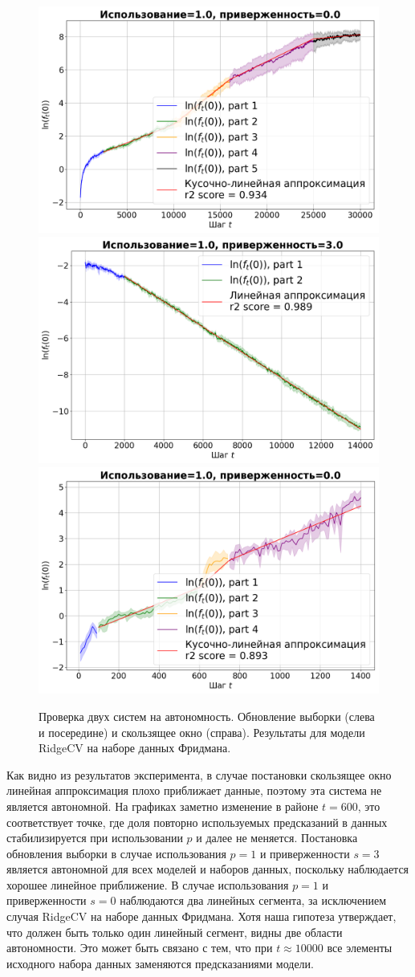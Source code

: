     \begin{figure}[h!]
        \centering
        \includegraphics[width=0.32\linewidth]{pictures/aut_su_friedman_ridgecv_model_1.0_0.0.png}
        \includegraphics[width=0.32\linewidth]{pictures/aut_su_friedman_ridgecv_model_1.0_3.0.png}
        \includegraphics[width=0.32\linewidth]{pictures/aut_sw_friedman_ridgecv_model_1.0_0.0.png}
        
        \caption{Проверка двух систем на автономность. Обновление выборки (слева и посередине) и скользящее окно (справа). Результаты для модели RidgeCV на наборе данных Фридмана.}
        \label{fig_exp_4_4}
    \end{figure}

    Как видно из результатов эксперимента, в случае постановки скользящее окно линейная аппроксимация плохо приближает данные, поэтому эта система не является автономной. На графиках заметно изменение в районе $t = 600$, это соответствует точке, где доля повторно используемых предсказаний в данных стабилизируется при использовании $p$ и далее не меняется. Постановка обновления выборки в случае использования $p = 1$ и приверженности $s = 3$ является автономной для всех моделей и наборов данных, поскольку наблюдается хорошее линейное приближение. В случае использования $p = 1$ и приверженности $s = 0$ наблюдаются два линейных сегмента, за исключением случая RidgeCV на наборе данных Фридмана. Хотя наша гипотеза утверждает, что должен быть только один линейный сегмент, видны две области автономности. Это может быть связано с тем, что при $t \approx 10000$ все элементы исходного набора данных заменяются предсказаниями модели.

